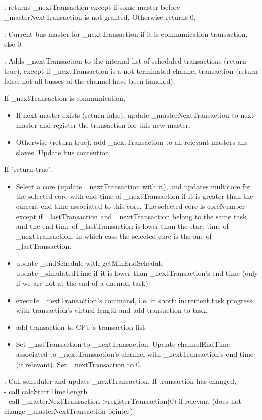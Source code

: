 \documentclass[a4paper,11pt]{article}
\newcommand{\bfont}{\fontseries{b}\selectfont}
\newcommand{\cod}[1]{{\ttfamily #1}}
\newcommand{\method}[1]{\par\vspace{1mm}\hspace{-2mm}\colorbox{method}{\textopenbullet\bfont\cod{#1}:}}
\newcommand{\variable}[1]{\par\vspace{1mm}\hspace{-2mm}\colorbox{variable}{\textopenbullet\bfont\cod{#1}:}}
\begin{document}
\method{getNextTransaction} returns \cod{\_nextTransaction} except if some master before \cod{\_mas\-terNextTransaction} is not granted. Otherwise returns 0.
\variable{\_masterNextTransaction} Current bus master for \cod{\_nextTransaction} if it is communication transaction, else 0.
\method{addTransaction} Adds \cod{\_nextTransaction} to the internal list of scheduled transactions (return true), except if \cod{\_nextTransaction} is a not terminated channel transaction (return false: not all busses of the channel have been handled).

If \cod{\_nextTransaction} is communication,
\begin{itemize}
	\item If next master exists (return false), update \cod{\_masterNextTransaction} to next master and register the transaction for this new master.
	\item Otherwise (return true), add \cod{\_nextTransaction} to all relevant masters ans slaves. Update bus contention.
\end{itemize}
If "return true",
\begin{itemize}
	\item Select a core (update \cod{\_nextTransaction} with it), and updates \cod{multicore} for the selected core with end time of \cod{\_nextTransaction} if it is greater than the current end time associated to this core. The selected core is \cod{coreNumber} except if \cod{\_lastTransaction} and \cod{\_nextTransaction} belong to the same task and the end time of \cod{\_lastTransaction} is lower than the start time of \cod{\_nextTransaction}, in which case the selected core  is the one of  \cod{\_lastTransaction}.
	\item update \cod{\_endSchedule} with \cod{getMinEndSchedule}\\
	update \cod{\_simulatedTime} if it is lower than \cod{\_nextTransaction}'s end time (only if we are not at the end of a daemon task)
	\item execute \cod{\_nextTransaction}'s command, i.e. in short: increment task progress with transaction's virtual length and add transaction to task.
	\item add transaction to CPU's transaction list.
	\item Set \cod{\_lastTransaction} to \cod{\_nextTransaction}. Update \cod{channelEndTime} associated to \cod{\_nextTransaction}'s channel with \cod{\_nextTransaction}'s end time (if relevant). Set \cod{\_nextTransaction} to 0.
\end{itemize}
\method{schedule(iEndSchedule)} Call scheduler and update \cod{\_nextTransaction}. If transaction has changed,\\
- call \cod{calcStartTimeLength}\\
- call \cod{\_masterNextTransaction->registerTransaction(0)} if relevant (does not change \cod{\_masterNextTransaction} pointer).
\end{document}
